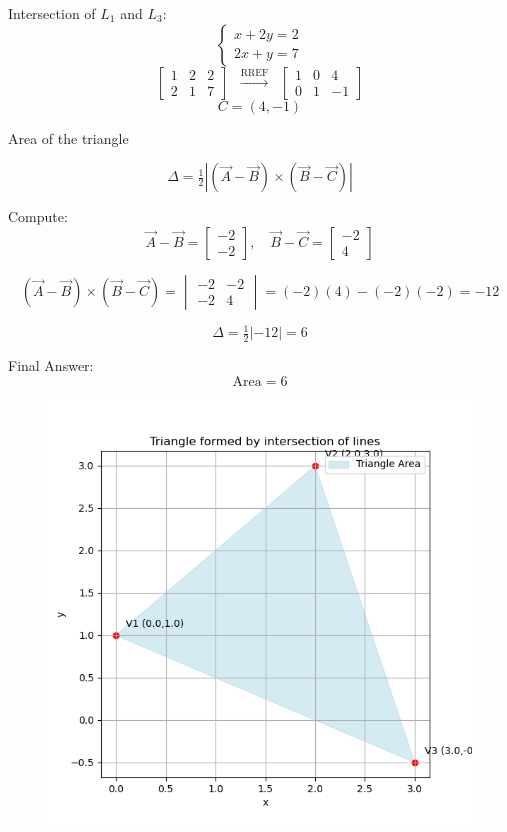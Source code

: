 \documentclass[journal]{IEEEtran}
\begin{document}
Intersection of $L_1$ and $L_3$:
\[
\begin{cases}
x + 2y = 2 \\
2x + y = 7
\end{cases}
\]
\[
\left[\begin{array}{cc|c}
1 & 2 & 2 \\
2 & 1 & 7
\end{array}\right]
\;\;\xrightarrow{\text{RREF}}\;\;
\left[\begin{array}{cc|c}
1 & 0 & 4 \\
0 & 1 & -1
\end{array}\right]
\]
\[
C = (4,-1)
\]


Area of the triangle

\[
\Delta = \tfrac{1}{2} \left| (\vec{A}-\vec{B}) \times (\vec{B}-\vec{C}) \right|
\]

Compute:
\[
\vec{A} - \vec{B} = \begin{bmatrix} -2 \\ -2 \end{bmatrix}, \quad
\vec{B} - \vec{C} = \begin{bmatrix} -2 \\ 4 \end{bmatrix}
\]

\[
(\vec{A}-\vec{B}) \times (\vec{B}-\vec{C}) =
\begin{vmatrix}
-2 & -2 \\
-2 & 4
\end{vmatrix}
= (-2)(4) - (-2)(-2) = -12
\]

\[
\Delta = \tfrac{1}{2} | -12 | = 6
\]



Final Answer:
\[
\text{Area} = 6
\]
\begin{figure}[H]
\begin{center}
\includegraphics[width=0.6\columnwidth]{Figs/Fig1.png}
\end{center}
\caption{}
\label{fig:Fig.1}
\end{figure}
\end{document}
